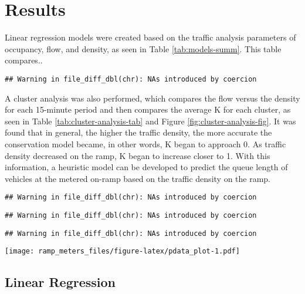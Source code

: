 \documentclass[numbered]{trbarticle}
\begin{document}
\hypertarget{section}{%
\subsection{}\label{section}}

\hypertarget{results}{%
\section{Results}\label{results}}

Linear regression models were created based on the traffic analysis parameters of occupancy, flow, and density, as seen in Table \ref{tab:models-summ}. This table compares..

\begin{verbatim}
## Warning in file_diff_dbl(chr): NAs introduced by coercion
\end{verbatim}

A cluster analysis was also performed, which compares the flow versus the density for each 15-minute period and then compares the average K for each cluster, as seen in Table \ref{tab:cluster-analysis-tab} and Figure \ref{fig:cluster-analysis-fig}. It was found that in general, the higher the traffic density, the more accurate the conservation model became, in other words, K began to approach 0. As traffic density decreased on the ramp, K began to increase closer to 1. With this information, a heuristic model can be developed to predict the queue length of vehicles at the metered on-ramp based on the traffic density on the ramp.

\begin{verbatim}
## Warning in file_diff_dbl(chr): NAs introduced by coercion
\end{verbatim}

\begin{verbatim}
## Warning in file_diff_dbl(chr): NAs introduced by coercion
\end{verbatim}

\begin{verbatim}
## Warning in file_diff_dbl(chr): NAs introduced by coercion
\end{verbatim}

\texttt{[image: ramp\_meters\_files/figure-latex/pdata\_plot-1.pdf]}

\hypertarget{linear-regression}{%
\subsection{Linear Regression}\label{linear-regression}}
\end{document}
